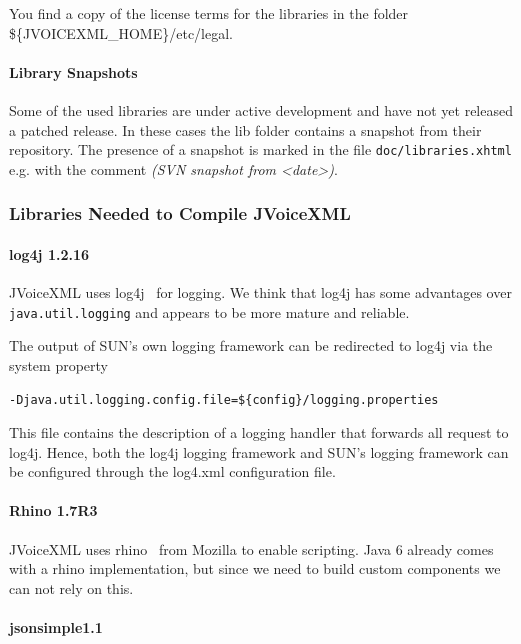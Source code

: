 \documentclass[11pt,a4paper]{article}
\begin{document}
You find a copy of the license terms for the libraries in the folder\\
\$\{JVOICEXML\_HOME\}/etc/legal.

\paragraph{Library Snapshots}

Some of the used libraries are under active development and have not yet
released a patched release. In these cases the lib folder contains a snapshot
from their repository. The presence of a snapshot is marked in the file
\texttt{doc/libraries.xhtml} e.g. with the comment \emph{(SVN snapshot from
<date>)}.



\subsubsection{Libraries Needed to Compile JVoiceXML}
\label{sec:libr-need-comp}

\paragraph{log4j 1.2.16}

JVoiceXML uses log4j~\cite{apache:log4j} for logging. We think that log4j has 
some advantages
over \texttt{java.util.logging} and appears to be more mature and reliable.

The output of SUN's own logging framework can be redirected to log4j via the
system property
\begin{lstlisting}
-Djava.util.logging.config.file=${config}/logging.properties
\end{lstlisting}

This file contains the description of a logging handler that forwards all
request to log4j. Hence, both the log4j logging framework and SUN's logging
framework can be configured through the log4.xml configuration file.

\paragraph{Rhino 1.7R3}

JVoiceXML uses rhino~\cite{rhino} from Mozilla to enable scripting.
Java 6 already comes with a rhino implementation, but since we need to
build custom components we can not rely on this.

\paragraph{jsonsimple1.1}
\end{document}
